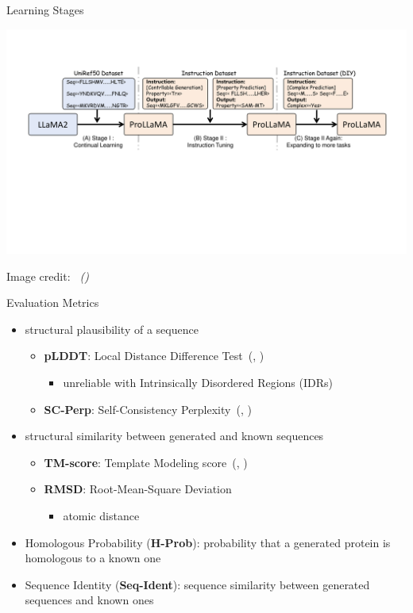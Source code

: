 \documentclass[dvipsnames,
hyperref={colorlinks,citecolor=black}
]{beamer}
\newcommand{\credit}[2]{\par\hfill \tiny #1 credit:~\itshape\citeauthor{#2} (\citeyear{#2})}
\renewcommand{\cite}[1]{(\citeauthor{#1}, \citeyear{#1})}
\newcommand{\red}[1]{{\color{red} #1}}
\begin{document}
\begin{frame}{Learning Stages}
	\begin{center}
		\includegraphics[scale=0.39]{images/training.pdf}
	\end{center}
	\credit{Image}{lv2024prollama}
\end{frame}

\begin{frame}{Evaluation Metrics}
	\begin{itemize}
		\item structural plausibility of a sequence
		\begin{itemize}
			\item \textbf{pLDDT}: Local Distance Difference Test~\cite{jumper2021highly}
			\begin{itemize}
				\item \red{unreliable with Intrinsically Disordered Regions (IDRs)}
			\end{itemize}
			\item \textbf{SC-Perp}: Self-Consistency Perplexity~\cite{alamdari2023protein}
		\end{itemize}
		\item structural similarity between generated and known sequences
		\begin{itemize}
			\item \textbf{TM-score}: Template Modeling score~\cite{zhang2004scoring}
			\item \textbf{RMSD}:  Root-Mean-Square Deviation
			\begin{itemize}
				\item atomic distance
			\end{itemize}
		\end{itemize}
		\item Homologous Probability (\textbf{H-Prob}): probability that a generated protein is homologous to a known one
		\item Sequence Identity (\textbf{Seq-Ident}): sequence similarity between generated sequences and known ones
	\end{itemize}
\end{frame}
\end{document}

